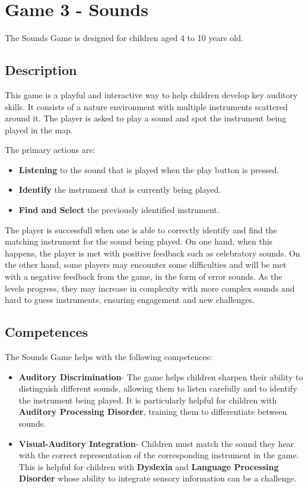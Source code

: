 \newpage
\section{Game 3 - Sounds}
\label{c3Sounds}

The Sounds Game is designed for children aged 4 to 10 years old.

\subsection*{Description}
This game is a playful and interactive way to help children develop key auditory skills. It consists of a nature environment with multiple instruments scattered around it. The player is asked to play a sound and spot the instrument being played in the map.

The primary actions are:

\begin{itemize}
    \item \textbf{Listening} to the sound that is played when the play button is pressed.
    \item \textbf{Identify} the instrument that is currently being played.
    \item \textbf{Find and Select} the previously identified instrument. 
\end{itemize}


The player is successfull when one is able to correctly identify and find the matching instrument for the sound being played. On one hand, when this happens, the player is met with positive feedback such as celebratory sounds. On the other hand, some players may encounter some difficulties and will be met with a negative feedback from the game, in the form of error sounds.
As the levels progress, they may increase in complexity with more complex sounds and hard to guess instruments, ensuring engagement and new challenges.

\subsection*{Competences}
The Sounds Game helps with the following competences:

\begin{itemize}
    \item \textbf{Auditory Discrimination}- The game helps children sharpen their ability to distinguish different sounds, allowing them to listen carefully and to identify the instrument being played. It is particularly helpful for children with \textbf{Auditory Processing Disorder}, training them to differentiate between sounds.

    \item \textbf{Visual-Auditory Integration}- Children must match the sound they hear with the correct representation of the corresponding instrument in the game. This is helpful for children with \textbf{Dyslexia} and \textbf{Language Processing Disorder} whose ability to integrate sensory information can be a challenge.
    
\end{itemize}

